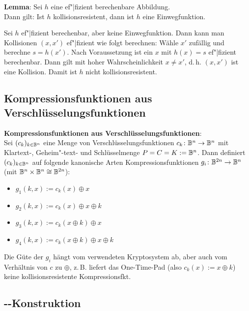 \textbf{Lemma}:
Sei $h$ eine ef"|fizient berechenbare Abbildung.\\
Dann gilt: Ist $h$ kollisionsresistent, dann ist $h$ eine Einwegfunktion.

\begin{Beweis}
    Sei $h$ ef"|fizient berechenbar, aber keine Einwegfunktion.
    Dann kann man Kollisionen $(x, x')$ ef"|fizient wie folgt berechnen:
    Wähle $x'$ zufällig und berechne $s = h(x')$.
    Nach Voraussetzung ist ein $x$ mit $h(x) = s$ ef"|fizient berechenbar.
    Dann gilt mit hoher Wahrscheinlichkeit $x \not= x'$,
    d.\,h. $(x, x')$ ist eine Kollision.
    Damit ist $h$ nicht kollisionsresistent.
\end{Beweis}

\subsection{%
    Kompressionsfunktionen aus Verschlüsselungsfunktionen%
}

\textbf{Kompressionsfunktionen aus Verschlüsselungsfunktionen}:\\
Sei $(c_k)_{k \in \mathbb{B}^n}$ eine Menge von Verschlüsselungsfunktionen $c_k\colon \mathbb{B}^n \to \mathbb{B}^n$
mit Klartext-, Geheim"-text- und Schlüsselmenge $P = C = K := \mathbb{B}^n$.
Dann definiert $(c_k)_{k \in \mathbb{B}^n}$ auf folgende kanonische Arten Kompressionsfunktionen
$g_i\colon \mathbb{B}^{2n} \to \mathbb{B}^n$ (mit $\mathbb{B}^n \times \mathbb{B}^n \cong \mathbb{B}^{2n}$):
\begin{itemize}
    \item
    $g_1(k, x) := c_k(x) \oplus x$
    
    \item
    $g_2(k, x) := c_k(x) \oplus x \oplus k$
    
    \item
    $g_3(k, x) := c_k(x \oplus k) \oplus x$
    
    \item
    $g_4(k, x) := c_k(x \oplus k) \oplus x \oplus k$
\end{itemize}
Die Güte der $g_i$ hängt vom verwendeten Kryptosystem ab,
aber auch vom Verhältnis von $c$ zu $\oplus$, z.\,B. liefert das One-Time-Pad
(also $c_k(x) := x \oplus k$) keine kollisionsresistente Kompressionsfkt.

\pagebreak

\subsection{%
    --Konstruktion%
}

